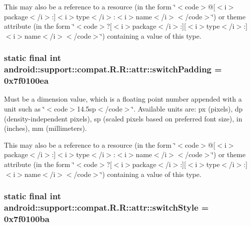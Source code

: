 This may also be a reference to a resource (in the form \char`\"{}$<$code$>$@\mbox{[}$<$i$>$package$<$/i$>$:\mbox{]}$<$i$>$type$<$/i$>$:$<$i$>$name$<$/i$>$$<$/code$>$\char`\"{}) or theme attribute (in the form \char`\"{}$<$code$>$?\mbox{[}$<$i$>$package$<$/i$>$:\mbox{]}\mbox{[}$<$i$>$type$<$/i$>$:\mbox{]}$<$i$>$name$<$/i$>$$<$/code$>$\char`\"{}) containing a value of this type. \hypertarget{classandroid_1_1support_1_1compat_1_1_r_1_1attr_e6159610e6b374e244ff226f1f41f92f}{
\subsubsection[{switchPadding}]{\setlength{\rightskip}{0pt plus 5cm}static final int android::support::compat.R.R::attr::switchPadding = 0x7f0100ea}}
\label{classandroid_1_1support_1_1compat_1_1_r_1_1attr_e6159610e6b374e244ff226f1f41f92f}


Must be a dimension value, which is a floating point number appended with a unit such as \char`\"{}$<$code$>$14.5sp$<$/code$>$\char`\"{}. Available units are: px (pixels), dp (density-independent pixels), sp (scaled pixels based on preferred font size), in (inches), mm (millimeters). 

This may also be a reference to a resource (in the form \char`\"{}$<$code$>$@\mbox{[}$<$i$>$package$<$/i$>$:\mbox{]}$<$i$>$type$<$/i$>$:$<$i$>$name$<$/i$>$$<$/code$>$\char`\"{}) or theme attribute (in the form \char`\"{}$<$code$>$?\mbox{[}$<$i$>$package$<$/i$>$:\mbox{]}\mbox{[}$<$i$>$type$<$/i$>$:\mbox{]}$<$i$>$name$<$/i$>$$<$/code$>$\char`\"{}) containing a value of this type. \hypertarget{classandroid_1_1support_1_1compat_1_1_r_1_1attr_7fffa5ca18873439ca95edc8c0766bde}{
\subsubsection[{switchStyle}]{\setlength{\rightskip}{0pt plus 5cm}static final int android::support::compat.R.R::attr::switchStyle = 0x7f0100ba}}
\label{classandroid_1_1support_1_1compat_1_1_r_1_1attr_7fffa5ca18873439ca95edc8c0766bde}


